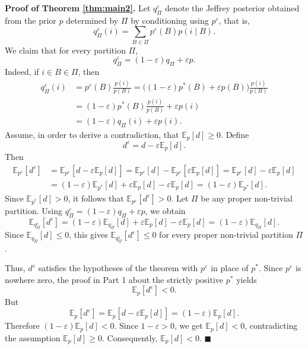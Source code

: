 \documentclass[10pt, letterpaper]{article}%
\theoremstyle{definition}
\renewenvironment{proof}[1][\unskip]{%
\par
\noindent
\textbf{Proof #1.}
\noindent}
{\hfill$\blacksquare$

\bigskip}
\newcommand{\E}{\mathbb E}
\newcommand{\1}{\mathbf 1}
\def\change{\marginpar[\hfill Change]{Change}}
\begin{document}
\begin{proof}[of Theorem \ref{thm:main2}]
    Let $q^\varepsilon_\Pi$ denote the Jeffrey posterior obtained from the prior $p$ determined by $\Pi$ by conditioning using $p^\varepsilon$, that is,
    \[
        q^\varepsilon_\Pi(i) = \sum_{B\in \Pi}
        p^\varepsilon(B)p(i\mid B).    
    \]
    We claim that for every partition $\Pi$,
    \[
        q^\varepsilon_\Pi=(1-\varepsilon)q_\Pi+\varepsilon p.
    \]
    Indeed, if $i\in B\in\Pi$, then
    \begin{align*}
        q^\varepsilon_\Pi(i) &=
        p^\varepsilon(B)\frac{p(i)}{p(B)} =
        \big((1-\varepsilon)p^*(B)+\varepsilon p(B)\big)\frac{p(i)}{p(B)} \\ 
        &= (1-\varepsilon)p^*(B)\frac{p(i)}{p(B)} +
        \varepsilon p(i) \\
        &= (1-\varepsilon)q_\Pi(i)+\varepsilon p(i).      
    \end{align*} 
    Assume, in order to derive a contradiction, that $\E_p[d]\geq 0$. Define
    \[
        d^\varepsilon=d-\varepsilon \E_p[d].
    \]
    Then
    \begin{align*}
        \E_{p^\varepsilon}[d^\varepsilon] &=
        \E_{p^\varepsilon}[d-\varepsilon\E_p[d]] = 
        \E_{p^\varepsilon}[d] -
        \E_{p^\varepsilon}[\varepsilon\E_p[d]] =
        \E_{p^\varepsilon}[d] -
        \varepsilon\E_p[d]  \\
        &=
        (1-\varepsilon)\E_{p^*}[d] +
        \varepsilon \E_p[d] -
        \varepsilon \E_p[d] =
        (1-\varepsilon)\E_{p^*}[d].
    \end{align*}
    Since $\E_{p^*}[d]>0$, it follows that $\E_{p^\varepsilon}[d^\varepsilon]>0$.
    Let $\Pi$ be any proper non-trivial partition. Using 
    $q^\varepsilon_\Pi=(1-\varepsilon)q_\Pi+\varepsilon p$, we obtain
    \[
        \E_{q^\varepsilon_\Pi}[d^\varepsilon] =
        (1-\varepsilon)\E_{q_\Pi}[d] +
        \varepsilon \E_p[d] -
        \varepsilon \E_p[d] =
        (1-\varepsilon)\E_{q_\Pi}[d].
    \]
    Since $\E_{q_\Pi}[d]\leq 0$, this gives $\E_{q^\varepsilon_\Pi}[d^\varepsilon]\leq 0$ for every proper non-trivial partition $\Pi$.

    Thus, $d^\varepsilon$ satisfies the hypotheses of the theorem with $p^\varepsilon$ in place of $p^*$. Since $p^\varepsilon$ is nowhere zero, %
    the proof in Part 1 about the strictly positive $p^*$ yields
    \[
        \E_p[d^\varepsilon]<0.
    \]
    But
    \[
        \E_p[d^\varepsilon] =
        \E_p[d-\varepsilon \E_p[d]] =
        (1-\varepsilon)\E_p[d].
    \]
    Therefore $(1-\varepsilon)\E_p[d]<0$. Since $1-\varepsilon>0$, we get $\E_p[d]<0$, contradicting the assumption $\E_p[d]\geq 0$. 
    Consequently, $\E_p[d]<0$. 
\end{proof}
\end{document}
